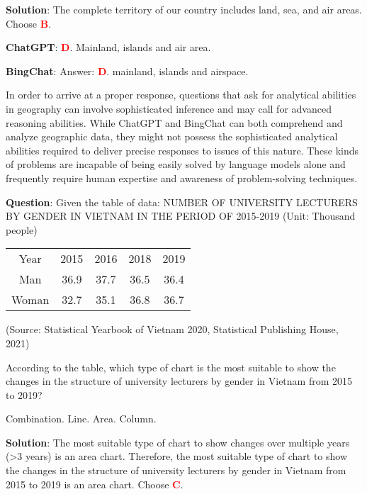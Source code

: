\documentclass{article}
\begin{document}
{\begin{mdframed}[linewidth=1pt,linecolor=red]
		\textbf{Solution}: The complete territory of our country includes land, sea, and air areas.
		Choose \textcolor{red}{\textbf{B}}.
		
		\textbf{ChatGPT}: \textcolor{red}{\textbf{D}}. Mainland, islands and air area.
		
		\textbf{BingChat}: Answer: \textcolor{red}{\textbf{D}}. mainland, islands and airspace.
		
	\end{mdframed}	
	
	In order to arrive at a proper response, questions that ask for analytical abilities in geography can involve sophisticated inference and may call for advanced reasoning abilities. While ChatGPT and BingChat can both comprehend and analyze geographic data, they might not possess the sophisticated analytical abilities required to deliver precise responses to issues of this nature. These kinds of problems are incapable of being easily solved by language models alone and frequently require human expertise and awareness of problem-solving techniques.
	
	
	\begin{mdframed}[linewidth=1pt,linecolor=red] \textbf{Question}: Given the table of data: NUMBER OF UNIVERSITY LECTURERS BY GENDER IN VIETNAM IN THE PERIOD OF 2015-2019
		(Unit: Thousand people)
		
		
		
		\begin{tabular}{ccccc}
			\multicolumn{1}{c}{Year} & 2015  & 2016  & 2018  & 2019   \\
			Man   & 36.9 & 37.7 & 36.5 & 36.4  \\
			Woman & 32.7 & 35.1 & 36.8 & 36.7  
		\end{tabular}
		
		(Source: Statistical Yearbook of Vietnam 2020, Statistical Publishing House, 2021)
		
		According to the table, which type of chart is the most suitable to show the changes in the structure of university lecturers by gender in Vietnam from 2015 to 2019?
		
		\begin{oneparchoices}
			\choice Combination.
			\choice Line.
			\choice Area.
			\choice  Column.
		\end{oneparchoices}
		
		\textbf{Solution}: The most suitable type of chart to show changes over multiple years (>3 years) is an area chart.
		Therefore, the most suitable type of chart to show the changes in the structure of university lecturers by gender in Vietnam from 2015 to 2019 is an area chart. Choose \textcolor{red}{\textbf{C}}. 
		

\end{mdframed}}
\end{document}
